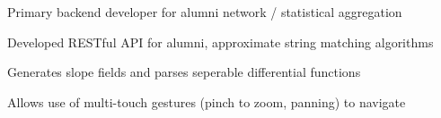 \documentclass[]{deedy-resume-openfont}
\begin{document}
\begin{minipage}[t]{0.66\textwidth}

\begin{tightemize}
\item Primary backend developer for alumni network / statistical aggregation \\
\item Developed RESTful API for alumni, approximate string matching algorithms\\
\end{tightemize}
\sectionsep

\begin{tightemize}
\item Generates slope fields and parses seperable differential functions\\
\item Allows use of multi-touch gestures (pinch to zoom, panning) to navigate\\
\end{tightemize}
\sectionsep



\end{minipage}
\end{document}
